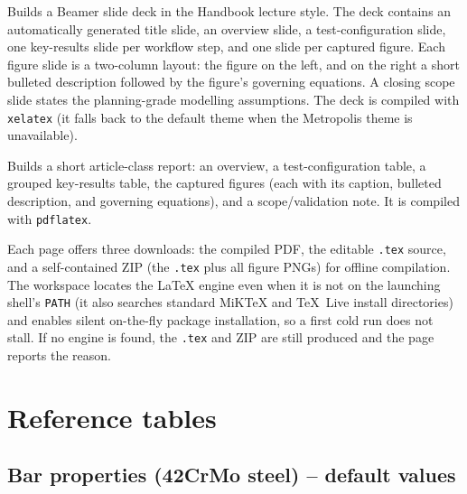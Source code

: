 \documentclass[11pt,a4paper,openany]{book}
\theoremstyle{handbook}
\begin{document}
\begin{description}[leftmargin=2em,style=nextline]
  \item[Step 6: Presentation] Builds a Beamer slide deck in the Handbook
    lecture style. The deck contains an automatically generated title slide,
    an overview slide, a test-configuration slide, one key-results slide per
    workflow step, and one slide per captured figure. Each figure slide is a
    two-column layout: the figure on the left, and on the right a short
    bulleted description followed by the figure's governing equations. A
    closing scope slide states the planning-grade modelling assumptions. The
    deck is compiled with \texttt{xelatex} (it falls back to the default theme
    when the Metropolis theme is unavailable).
  \item[Step 7: Report] Builds a short article-class report: an overview, a
    test-configuration table, a grouped key-results table, the captured
    figures (each with its caption, bulleted description, and governing
    equations), and a scope/validation note. It is compiled with
    \texttt{pdflatex}.
\end{description}

Each page offers three downloads: the compiled PDF, the editable \texttt{.tex}
source, and a self-contained ZIP (the \texttt{.tex} plus all figure PNGs) for
offline compilation. The workspace locates the \LaTeX{} engine even when it is
not on the launching shell's \texttt{PATH} (it also searches standard MiKTeX
and TeX~Live install directories) and enables silent on-the-fly package
installation, so a first cold run does not stall. If no engine is found, the
\texttt{.tex} and ZIP are still produced and the page reports the reason.


\appendix

\chapter{Reference tables}\label{app:tables}

\section{Bar properties (42CrMo steel) -- default values}
\end{document}

